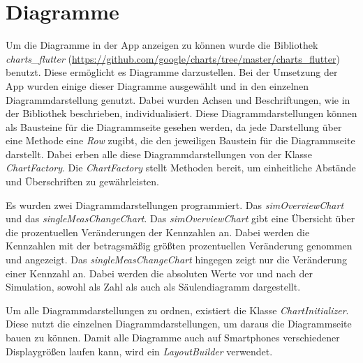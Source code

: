 	\section{Diagramme}
	\label{sec:charts}
	Um die Diagramme in der App anzeigen zu können wurde die Bibliothek \textit{charts\_flutter} (\url{https://github.com/google/charts/tree/master/charts_flutter}) benutzt. Diese ermöglicht es Diagramme darzustellen. Bei der Umsetzung der App wurden einige dieser Diagramme ausgewählt und in den einzelnen Diagrammdarstellung genutzt. Dabei wurden Achsen und Beschriftungen, wie in der Bibliothek beschrieben, individualisiert. Diese Diagrammdarstellungen können als Bausteine für die Diagrammseite gesehen werden, da jede Darstellung über eine Methode eine \textit{Row} zugibt, die den jeweiligen Baustein für die Diagrammseite darstellt. Dabei erben alle diese Diagrammdarstellungen von der Klasse \textit{ChartFactory}. Die \textit{ChartFactory} stellt Methoden bereit, um einheitliche Abstände und Überschriften zu gewährleisten.
	
	Es wurden zwei Diagrammdarstellungen programmiert. Das \textit{simOverviewChart} und das \textit{singleMeasChangeChart}. Das \textit{simOverviewChart} gibt eine Übersicht über die prozentuellen Veränderungen der Kennzahlen an. Dabei werden die Kennzahlen mit der betragsmäßig größten prozentuellen Veränderung genommen und angezeigt.
	Das \textit{singleMeasChangeChart} hingegen zeigt nur die Veränderung einer Kennzahl an. Dabei werden die absoluten Werte vor und nach der Simulation, sowohl als Zahl als auch als Säulendiagramm dargestellt.
	
	Um alle Diagrammdarstellungen zu ordnen, existiert die Klasse \textit{ChartInitializer}. Diese nutzt die einzelnen Diagrammdarstellungen, um daraus die Diagrammseite bauen zu können. Damit alle Diagramme auch auf Smartphones verschiedener Displaygrößen laufen kann, wird ein \textit{LayoutBuilder} verwendet. 